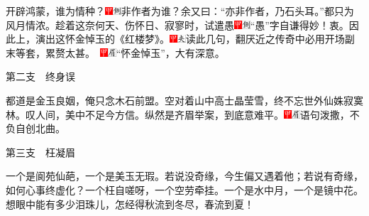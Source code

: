 开辟鸿蒙，谁为情种？{\includegraphics[width=3mm]{../Images/00002}\includegraphics[width=3mm]{../Images/00011}\footnotesize \kaishu 非作者为谁？余又曰：“亦非作者，乃石头耳。”}都只为风月情浓。趁着这奈何天、伤怀日、寂寥时，试遣愚{\includegraphics[width=3mm]{../Images/00002}\includegraphics[width=3mm]{../Images/00011}\footnotesize \kaishu “愚”字自谦得妙！}衷。因此上，演出这怀金悼玉的《红楼梦》。{\includegraphics[width=3mm]{../Images/00002}\includegraphics[width=3mm]{../Images/00012}\footnotesize \kaishu 读此几句，翻厌近之传奇中必用开场副末等套，累赘太甚。　\includegraphics[width=3mm]{../Images/00002}\includegraphics[width=3mm]{../Images/00010}\footnotesize \kaishu “怀金悼玉”，大有深意。}

第二支　终身误

都道是金玉良姻，俺只念木石前盟。空对着山中高士晶莹雪，终不忘世外仙姝寂寞林。叹人间，美中不足今方信。纵然是齐眉举案，到底意难平。{\includegraphics[width=3mm]{../Images/00002}\includegraphics[width=3mm]{../Images/00010}\footnotesize \kaishu 语句泼撒，不负自创北曲。}

第三支　枉凝眉

一个是阆苑仙葩，一个是美玉无瑕。若说没奇缘，今生偏又遇着他；若说有奇缘，如何心事终虚化？一个枉自嗟呀，一个空劳牵挂。一个是水中月，一个是镜中花。想眼中能有多少泪珠儿，怎经得秋流到冬尽，春流到夏！

